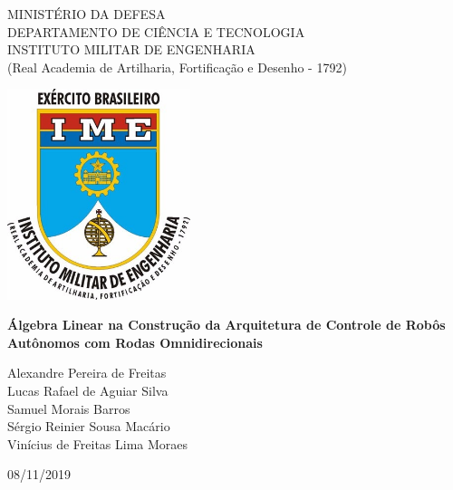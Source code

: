 \documentclass{article}
\begin{document}
\begin{titlepage}
    \begin{center}
        \large
        \textbf{} MINISTÉRIO DA DEFESA\\
        \textbf{}DEPARTAMENTO DE CIÊNCIA E TECNOLOGIA\\
        \textbf{}INSTITUTO MILITAR DE ENGENHARIA\\
        \textbf{} \textit{}(Real Academia de Artilharia, Fortificação e Desenho - 1792)\\
        \vspace{0.5cm}
 
        \vfill
        \includegraphics[width=0.4\textwidth]{ime.jpg}

        \vspace{0,9cm}

        \LARGE
        \textbf{Álgebra Linear na Construção da Arquitetura de Controle de Robôs Autônomos com Rodas Omnidirecionais}
 
        \vspace{1,5cm}
        \large
 
        \vspace{2,5cm}
 
        Alexandre Pereira de Freitas\\
        Lucas Rafael de Aguiar Silva\\
        Samuel Morais Barros\\
        Sérgio Reinier Sousa Macário\\
        Vinícius de Freitas Lima Moraes\\
 
        \vfill
 
        \vspace{0.5cm}
 
        \Large
        08/11/2019
 
    \end{center}
\end{titlepage}
\end{document}
